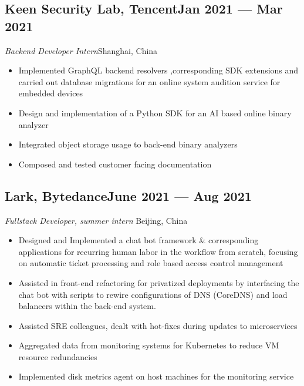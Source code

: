 \documentclass[a4,12pt]{article}
\newcommand{\subtext}[1]{
#1\par\vspace{-0.2cm}}
\newenvironment{zitemize}{
\begin{itemize}\itemsep0pt \parskip0pt \parsep1pt}
{\end{itemize}\vspace{-0.5cm}}
\begin{document}
\subsection*{Keen Security Lab, Tencent\hfill Jan 2021 --- Mar 2021} 
\subtext{\textit{Backend Developer Intern}\hfill Shanghai, China} 
    \begin{zitemize}
        \item Implemented GraphQL backend resolvers ,corresponding SDK extensions and carried out database migrations for an online system audition service for embedded devices
        \item Design and implementation of a Python SDK for an AI based online binary analyzer
        \item Integrated object storage usage to back-end binary analyzers
        \item Composed and tested customer facing documentation 
    \end{zitemize}


\subsection*{Lark, Bytedance\hfill June 2021 --- Aug 2021} 
\subtext{\textit{Fullstack Developer, summer intern } \hfill Beijing, China} 
    \begin{zitemize}
        \item Designed and Implemented a chat bot framework \& corresponding applications for recurring human labor in the workflow from scratch, focusing on automatic ticket processing and role based access control management
        \item Assisted in front-end refactoring for privatized deployments by interfacing the chat bot with scripts to rewire configurations of DNS (CoreDNS) and load balancers within the back-end system.
        \item Assisted SRE colleagues, dealt with hot-fixes during updates to microservices
        \item Aggregated data from monitoring systems for Kubernetes to reduce VM resource redundancies
        \item Implemented disk metrics agent on host machines for the monitoring service
    \end{zitemize}
\end{document}
